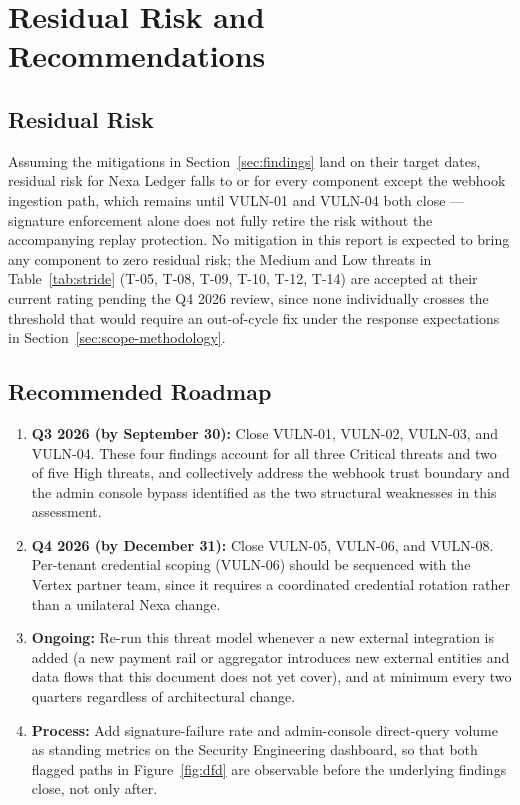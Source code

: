 \section{Residual Risk and Recommendations}
\label{sec:recommendations}

\subsection{Residual Risk}

Assuming the mitigations in Section~\ref{sec:findings} land on their target dates, residual risk for Nexa Ledger falls to \lowrisk{} or \mediumrisk{} for every component except the webhook ingestion path, which remains \highrisk{} until VULN-01 and VULN-04 both close --- signature enforcement alone does not fully retire the risk without the accompanying replay protection. No mitigation in this report is expected to bring any component to zero residual risk; the Medium and Low threats in Table~\ref{tab:stride} (T-05, T-08, T-09, T-10, T-12, T-14) are accepted at their current rating pending the Q4 2026 review, since none individually crosses the threshold that would require an out-of-cycle fix under the response expectations in Section~\ref{sec:scope-methodology}.

\subsection{Recommended Roadmap}

\begin{enumerate}[leftmargin=1.4em]
  \item \textbf{Q3 2026 (by September 30):} Close VULN-01, VULN-02, VULN-03, and VULN-04. These four findings account for all three Critical threats and two of five High threats, and collectively address the webhook trust boundary and the admin console bypass identified as the two structural weaknesses in this assessment.
  \item \textbf{Q4 2026 (by December 31):} Close VULN-05, VULN-06, and VULN-08. Per-tenant credential scoping (VULN-06) should be sequenced with the Vertex partner team, since it requires a coordinated credential rotation rather than a unilateral Nexa change.
  \item \textbf{Ongoing:} Re-run this threat model whenever a new external integration is added (a new payment rail or aggregator introduces new external entities and data flows that this document does not yet cover), and at minimum every two quarters regardless of architectural change.
  \item \textbf{Process:} Add signature-failure rate and admin-console direct-query volume as standing metrics on the Security Engineering dashboard, so that both flagged paths in Figure~\ref{fig:dfd} are observable before the underlying findings close, not only after.
\end{enumerate}

